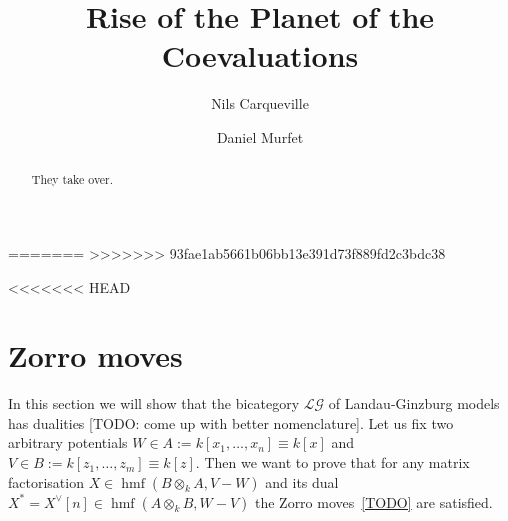 \documentclass{compositio}
\theoremstyle{definition}
\numberwithin{equation}{section}
\DeclareMathOperator{\hmf}{hmf}
\begin{document}
=======
>>>>>>> 93fae1ab5661b06bb13e391d73f889fd2c3bdc38
\title{Rise of the Planet of the Coevaluations}
\author{Nils Carqueville}
\address{Arnold Sommerfeld Center for Theoretical Physics, LMU M\"unchen \& Excellence Cluster Universe}

\author{Daniel Murfet}
\address{Department of Mathematics, UCLA}


\begin{abstract}
They take over. 
\end{abstract}

\maketitle

<<<<<<< HEAD

\section{Zorro moves}\label{sec:Zorro}

In this section we will show that the bicategory $\mathcal{LG}$ of Landau-Ginzburg models has dualities [TODO: come up with better nomenclature]. Let us fix two arbitrary potentials $W\in A:= k[x_1,\ldots,x_n]\equiv k[x]$ and $V\in B:= k[z_1,\ldots,z_m]\equiv k[z]$. Then we want to prove that for any matrix factorisation $X\in \hmf(B \otimes_k A, V-W)$ and its dual $X^* = X^\vee[n]\in \hmf(A \otimes_k B, W-V)$ the Zorro moves~\eqref{TODO} are satisfied. 
\end{document}
